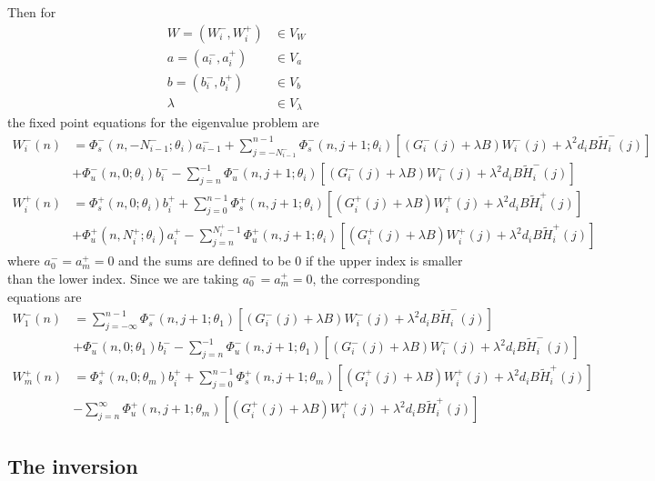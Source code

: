 \documentclass[12pt]{elsarticle}
\begin{document}
Then for
\begin{align*}
W = (W_i^-, W_i^+) &\in V_W \\
a = (a_i^-, a_i^+) &\in V_a \\
b = (b_i^-, b_i^+) &\in V_b \\
\lambda &\in V_\lambda
\end{align*}
the fixed point equations for the eigenvalue problem are
\begin{equation}\label{fpeig}
\begin{aligned}
W_i^-(n) &= 
\Phi_s^-(n, -N_{i-1}^-; \theta_i) a_{i-1}^- + \sum_{j = -N_{i-1}^-}^{n-1} \Phi_s^-(n, j+1; \theta_i)
[(G_i^-(j) + \lambda B) W_i^-(j) + \lambda^2 d_i B \tilde{H}_i^-(j)]
 \\
&+ \Phi_u^-(n, 0; \theta_i) b_i^- - \sum_{j = n}^{-1} \Phi_u^-(n, j+1; \theta_i) 
[(G_i^-(j) + \lambda B) W_i^-(j) + \lambda^2 d_i B \tilde{H}_i^-(j)] \\
W_i^+(n) &= \Phi_s^+(n, 0; \theta_i) b_i^+ + \sum_{j = 0}^{n-1} \Phi_s^+(n, j+1; \theta_i) 
[(G_i^+(j) + \lambda B) W_i^+(j) + \lambda^2 d_i B \tilde{H}_i^+(j)] \\
&+ \Phi_u^+(n, N_i^+; \theta_i) a_i^+ - \sum_{j = n}^{N_i^+-1} \Phi_u^+(n, j+1; \theta_i) 
[(G_i^+(j) + \lambda B) W_i^+(j) + \lambda^2 d_i B \tilde{H}_i^+(j)]
\end{aligned}
\end{equation}
where $a_0^- = a_m^+ = 0$ and the sums are defined to be $0$ if the upper index is smaller than the lower index. Since we are taking $a_0^- = a_m^+ = 0$, the corresponding equations are
\begin{align*}
W_1^-(n) &= \sum_{j = -\infty}^{n-1} \Phi_s^-(n, j+1; \theta_1)
[(G_i^-(j) + \lambda B) W_i^-(j) + \lambda^2 d_i B \tilde{H}_i^-(j)]
 \\
&+ \Phi_u^-(n, 0; \theta_1) b_i^- - \sum_{j = n}^{-1} \Phi_u^-(n, j+1; \theta_1) 
[(G_i^-(j) + \lambda B) W_i^-(j) + \lambda^2 d_i B \tilde{H}_i^-(j)] \\
W_m^+(n) &= \Phi_s^+(n, 0; \theta_m) b_i^+ + \sum_{j = 0}^{n-1} \Phi_s^+(n, j+1; \theta_m) 
[(G_i^+(j) + \lambda B) W_i^+(j) + \lambda^2 d_i B \tilde{H}_i^+(j)] \\
&- \sum_{j = n}^{\infty} \Phi_u^+(n, j+1; \theta_m) 
[(G_i^+(j) + \lambda B) W_i^+(j) + \lambda^2 d_i B \tilde{H}_i^+(j)]
\end{align*}

\subsection{The inversion}
\end{document}
